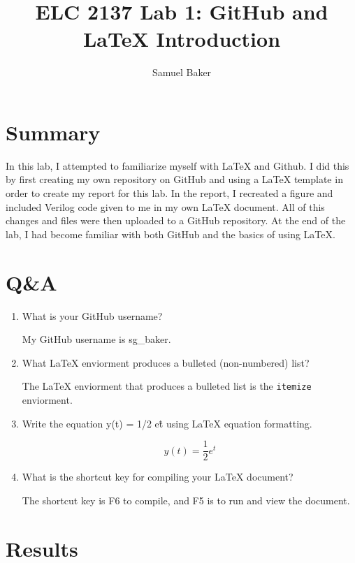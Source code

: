 \documentclass[11pt]{article}
\begin{document}
\title{ELC 2137 Lab 1: GitHub and LaTeX Introduction}
\author{Samuel Baker}

\maketitle


\section*{Summary}

In this lab, I attempted to familiarize myself with LaTeX and Github. I did this by first creating my own repository on GitHub and using a LaTeX template in order to create my report for this lab. In the report, I recreated a figure and included Verilog code given to me in my own LaTeX document. All of this changes and files were then uploaded to a GitHub repository. At the end of the lab, I had become familiar with both GitHub and the basics of using LaTeX.


\section*{Q\&A}

\begin{enumerate}
	\item What is your GitHub username?
	
	My GitHub username is sg\_baker.
	
	\item What LaTeX enviorment produces a bulleted (non-numbered) list?
	
	The LaTeX enviorment that produces a bulleted list is the \texttt{itemize} enviorment.
	
	\item Write the equation y(t) = 1/2 e\^t using LaTeX equation formatting.
	
	\begin{equation}
		y(t) = \frac{1}{2}e^t
	\end{equation}
	
	\item What is the shortcut key for compiling your LaTeX document?
	
	The shortcut key is F6 to compile, and F5 is to run and view the document.
\end{enumerate}


\section*{Results}
\end{document}
